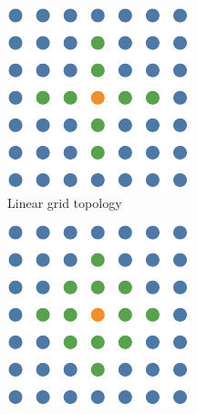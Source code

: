 \begin{figure}[t]
    \begin{subfigure}[t]{0.3\textwidth}
        \includegraphics[width=\textwidth]{img/master_neigh_linear.pdf}
        \caption{Linear grid topology}
        \label{fig:topologygridlinear}
    \end{subfigure}
    \hfill
    \begin{subfigure}[t]{0.3\textwidth}
        \includegraphics[width=\textwidth]{img/master_neigh_diamond.pdf}

\end{subfigure}
\end{figure}
